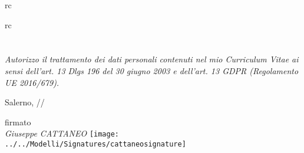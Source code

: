 \documentclass[italian,a4paper]{europasscv}
\newcommand{\currentDate}{\svnfileday/\svnfilemonth/\svnfileyear}
\begin{document}
\begin{europasscv}
  \newpage
  
  \nocite{*}
  
  
  
  
  \begin{refcontext}[labelprefix=J]{rc}
  \renewcommand*{\bibfont}{\footnotesize}
  \printbibliography[type=article, title={Articoli su riviste internazionali}, heading=subbibliography, resetnumbers=1]
  
  \end{refcontext}
  
  
  \begin{refcontext}[labelprefix=W]{rc}
  \renewcommand*{\bibfont}{\footnotesize}
  \printbibliography[nottype=article,title={Articoli presentati a conferenze internazionali}, heading=subbibliography, resetnumbers=1]
  
  \end{refcontext}
  
\section*{}
\emph{Autorizzo il trattamento dei dati personali contenuti nel mio  Curriculum Vitae ai sensi dell’art. 13 Dlgs 196 del 30 giugno 2003 e  dell’art. 13 GDPR (Regolamento UE 2016/679).}

\bigskip

Salerno, \currentDate

\hfill\parbox[t]{8cm}{
  \begin{center}
    firmato\\
    \textit{Giuseppe CATTANEO}
	 \texttt{[image: ../../Modelli/Signatures/cattaneosignature]}
  \end{center}
}
	

  \clearpage
  
  \end{europasscv}
\end{document}
